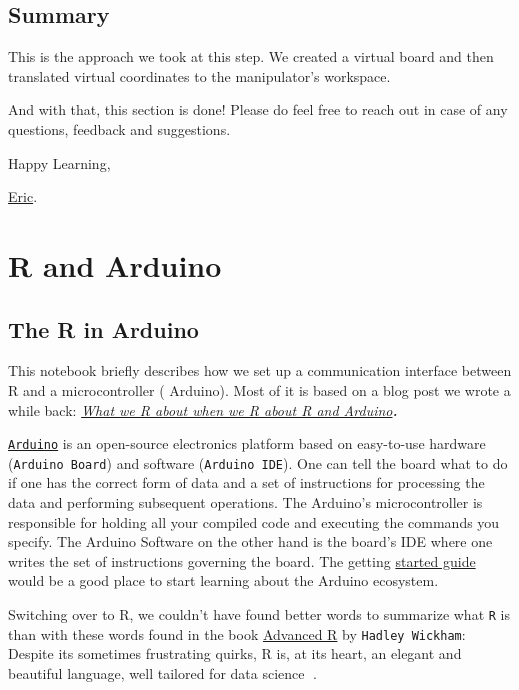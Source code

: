 \documentclass[
  letterpaper,
  DIV=11,
  numbers=noendperiod]{scrreprt}
\begin{document}
\hypertarget{summary-1}{%
\section{Summary}\label{summary-1}}

This is the approach we took at this step. We created a virtual board
and then translated virtual coordinates to the manipulator's workspace.

And with that, this section is done! Please do feel free to reach out in
case of any questions, feedback and suggestions.

Happy Learning,

\href{https://twitter.com/ericntay}{Eric}.

\hypertarget{r-and-arduino}{%
\chapter{R and Arduino}\label{r-and-arduino}}

\hypertarget{the-r-in-arduino}{%
\section{The R in Arduino}\label{the-r-in-arduino}}

This notebook briefly describes how we set up a communication interface
between R and a microcontroller ( Arduino). Most of it is based on a
blog post we wrote a while back:
\href{https://rpubs.com/eR_ic/rduino}{\emph{What we R about when we R
about R and Arduino}}\textbf{\emph{.}}

\href{https://www.arduino.cc/en/Guide/Introduction}{\texttt{Arduino}} is
an open-source electronics platform based on easy-to-use hardware
(\texttt{Arduino\ Board}) and software (\texttt{Arduino\ IDE}). One can
tell the board what to do if one has the correct form of data and a set
of instructions for processing the data and performing subsequent
operations. The Arduino's microcontroller is responsible for holding all
your compiled code and executing the commands you specify. The Arduino
Software on the other hand is the board's IDE where one writes the set
of instructions governing the board. The getting
\href{https://www.arduino.cc/en/Guide}{started guide} would be a good
place to start learning about the Arduino ecosystem.

Switching over to R, we couldn't have found better words to summarize
what \texttt{R} is than with these words found in the book
\href{https://adv-r.hadley.nz/introduction.html}{Advanced R} by
\texttt{Hadley\ Wickham}: Despite its sometimes frustrating quirks, R
is, at its heart, an elegant and beautiful language, well tailored for
data science 🤗.
\end{document}
